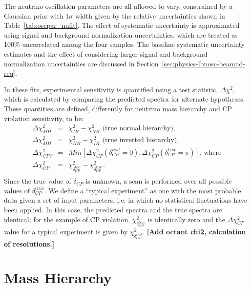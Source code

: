 The neutrino oscillation parameters are all
allowed to vary, constrained by a Gaussian prior with 1$\sigma$ width given
by the relative uncertainties shown in Table~\ref{tab:oscpar_nufit}.
The effect of systematic uncertainty
is approximated using signal and background normalization uncertainties, which
are treated as 100\% uncorrelated among the four samples.
The baseline systematic uncertainty estimates and the effect
of considering larger signal and background normalization uncertainties are
discussed in Section~\ref{sec:physics-lbnosc-beamnd-req}. 

In these fits, experimental sensitivity is
quantified using a test statistic, $\Delta\chi^2$, which is calculated
by comparing the predicted spectra for alternate hypotheses.
These quantities are defined, differently for neutrino mass hierarchy
and CP violation sensitivity, to be:
\begin{eqnarray}
\Delta\chi^2_{MH} & = & \chi^2_{IH} - \chi^2_{NH}\textrm{ (true normal hierarchy),}\\ 
\Delta\chi^2_{MH} & = & \chi^2_{NH} - \chi^2_{IH}\textrm{ (true inverted hierarchy),}\\
\Delta\chi^2_{CPV} & = & Min[\Delta\chi^2_{CP}(\delta_{CP}^{test}=0),\Delta\chi^2_{CP}(\delta_{CP}^{test}=\pi)]\textrm{, where} \\
\Delta\chi^2_{CP} & = & \chi^2_{\delta_{CP}^{test}} - \chi^2_{\delta_{CP}^{true}}. \\ \nonumber
\end{eqnarray}
Since the true value of $\delta_{CP}$ is unknown, a scan is  performed over
all possible values of $\delta_{CP}^{true}$. 
We define a ``typical experiment'' as one with the most probable data given a set of input parameters, 
i.e. in which no statistical fluctuations have been applied.
In this case, the predicted spectra and the true spectra are identical;
for the example of CP violation, $\chi^2_{\delta_{CP}^{true}}$ 
is identically zero and the $\Delta\chi^2_{CP}$ value for a typical experiment is given by 
$\chi^2_{\delta_{CP}^{test}}$.
{\bf [Add octant chi2, calculation of resolutions.]}

\section{Mass Hierarchy}
\label{sec:physics-lbnosc-mh}

